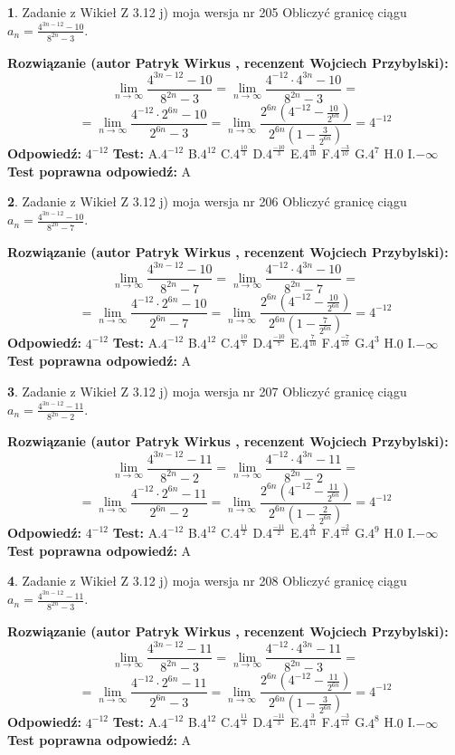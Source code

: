 \documentclass[12pt, a4paper]{article}
\theoremstyle{definition} %
\newtheorem{zad}{}
\newcommand{\zadStart}[1]{\begin{zad}#1\newline}
\newcommand{\zadStop}{\end{zad}}
\newcommand{\rozwStart}[2]{\noindent \textbf{Rozwiązanie (autor #1 , recenzent #2): }\newline}
\newcommand{\rozwStop}{\newline}
\newcommand{\odpStart}{\noindent \textbf{Odpowiedź:}\newline}
\newcommand{\odpStop}{\newline}
\newcommand{\testStart}{\noindent \textbf{Test:}\newline}
\newcommand{\testStop}{\newline}
\newcommand{\kluczStart}{\noindent \textbf{Test poprawna odpowiedź:}\newline}
\newcommand{\kluczStop}{\newline}
\begin{document}
\zadStart{Zadanie z Wikieł Z 3.12 j) moja wersja nr 205}
Obliczyć granicę ciągu $a_{n}=\frac{4^{3n-12}-10}{8^{2n}-3}$.
\zadStop
\rozwStart{Patryk Wirkus}{Wojciech Przybylski}
$$\lim\limits_{n\to\infty}\frac{4^{3n-12}-10}{8^{2n}-3}= \lim\limits_{n\to\infty}\frac{4^{-12} \cdot 4^{3n}-10}{8^{2n}-3}=$$
$$= \lim\limits_{n\to\infty}\frac{4^{-12} \cdot 2^{6n}-10}{2^{6n}-3}= \lim\limits_{n\to\infty}\frac{2^{6n}(4^{-12} - \frac{10}{2^{6n}})}{2^{6n}(1-\frac{3}{2^{6n}})}= 4^{-12}$$
\rozwStop
\odpStart
$4^{-12}$
\odpStop
\testStart
A.$4^{-12}$
B.$4^{12}$
C.$4^{\frac{10}{3}}$
D.$4^{\frac{-10}{3}}$
E.$4^{\frac{3}{10}}$
F.$4^{\frac{-3}{10}}$
G.$4^{7}$
H.$0$
I.$-\infty$
\testStop
\kluczStart
A
\kluczStop



\zadStart{Zadanie z Wikieł Z 3.12 j) moja wersja nr 206}
Obliczyć granicę ciągu $a_{n}=\frac{4^{3n-12}-10}{8^{2n}-7}$.
\zadStop
\rozwStart{Patryk Wirkus}{Wojciech Przybylski}
$$\lim\limits_{n\to\infty}\frac{4^{3n-12}-10}{8^{2n}-7}= \lim\limits_{n\to\infty}\frac{4^{-12} \cdot 4^{3n}-10}{8^{2n}-7}=$$
$$= \lim\limits_{n\to\infty}\frac{4^{-12} \cdot 2^{6n}-10}{2^{6n}-7}= \lim\limits_{n\to\infty}\frac{2^{6n}(4^{-12} - \frac{10}{2^{6n}})}{2^{6n}(1-\frac{7}{2^{6n}})}= 4^{-12}$$
\rozwStop
\odpStart
$4^{-12}$
\odpStop
\testStart
A.$4^{-12}$
B.$4^{12}$
C.$4^{\frac{10}{7}}$
D.$4^{\frac{-10}{7}}$
E.$4^{\frac{7}{10}}$
F.$4^{\frac{-7}{10}}$
G.$4^{3}$
H.$0$
I.$-\infty$
\testStop
\kluczStart
A
\kluczStop



\zadStart{Zadanie z Wikieł Z 3.12 j) moja wersja nr 207}
Obliczyć granicę ciągu $a_{n}=\frac{4^{3n-12}-11}{8^{2n}-2}$.
\zadStop
\rozwStart{Patryk Wirkus}{Wojciech Przybylski}
$$\lim\limits_{n\to\infty}\frac{4^{3n-12}-11}{8^{2n}-2}= \lim\limits_{n\to\infty}\frac{4^{-12} \cdot 4^{3n}-11}{8^{2n}-2}=$$
$$= \lim\limits_{n\to\infty}\frac{4^{-12} \cdot 2^{6n}-11}{2^{6n}-2}= \lim\limits_{n\to\infty}\frac{2^{6n}(4^{-12} - \frac{11}{2^{6n}})}{2^{6n}(1-\frac{2}{2^{6n}})}= 4^{-12}$$
\rozwStop
\odpStart
$4^{-12}$
\odpStop
\testStart
A.$4^{-12}$
B.$4^{12}$
C.$4^{\frac{11}{2}}$
D.$4^{\frac{-11}{2}}$
E.$4^{\frac{2}{11}}$
F.$4^{\frac{-2}{11}}$
G.$4^{9}$
H.$0$
I.$-\infty$
\testStop
\kluczStart
A
\kluczStop



\zadStart{Zadanie z Wikieł Z 3.12 j) moja wersja nr 208}
Obliczyć granicę ciągu $a_{n}=\frac{4^{3n-12}-11}{8^{2n}-3}$.
\zadStop
\rozwStart{Patryk Wirkus}{Wojciech Przybylski}
$$\lim\limits_{n\to\infty}\frac{4^{3n-12}-11}{8^{2n}-3}= \lim\limits_{n\to\infty}\frac{4^{-12} \cdot 4^{3n}-11}{8^{2n}-3}=$$
$$= \lim\limits_{n\to\infty}\frac{4^{-12} \cdot 2^{6n}-11}{2^{6n}-3}= \lim\limits_{n\to\infty}\frac{2^{6n}(4^{-12} - \frac{11}{2^{6n}})}{2^{6n}(1-\frac{3}{2^{6n}})}= 4^{-12}$$
\rozwStop
\odpStart
$4^{-12}$
\odpStop
\testStart
A.$4^{-12}$
B.$4^{12}$
C.$4^{\frac{11}{3}}$
D.$4^{\frac{-11}{3}}$
E.$4^{\frac{3}{11}}$
F.$4^{\frac{-3}{11}}$
G.$4^{8}$
H.$0$
I.$-\infty$
\testStop
\kluczStart
A
\kluczStop
\end{document}
